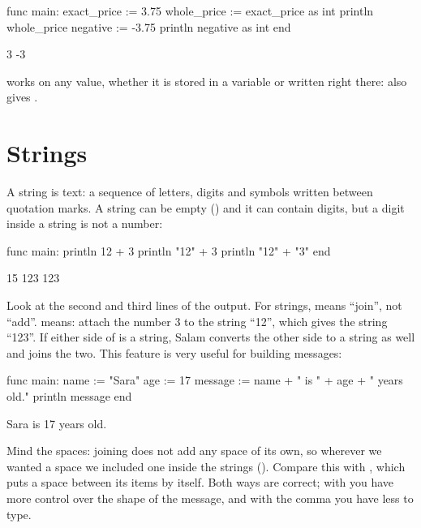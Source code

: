 \begin{salamcode}
func main:
    exact_price := 3.75
    whole_price := exact_price as int
    println whole_price
    negative := -3.75
    println negative as int
end
\end{salamcode}

\begin{salamout}
3
-3
\end{salamout}

\begin{note}
 works on any value, whether it is stored in a variable or written
right there:  also gives .
\end{note}

\section{Strings}

A string is text: a sequence of letters, digits and symbols written between
quotation marks. A string can be empty () and it can contain
digits, but a digit inside a string is not a number:

\begin{salamcode}
func main:
    println 12 + 3
    println "12" + 3
    println "12" + "3"
end
\end{salamcode}

\begin{salamout}
15
123
123
\end{salamout}

Look at the second and third lines of the output. For strings, \code{+}
means ``join'', not ``add''.  means: attach the number 3 to
the string ``12'', which gives the string ``123''. If either side of
\code{+} is a string, Salam converts the other side to a string as well and
joins the two. This feature is very useful for building messages:

\begin{salamcode}
func main:
    name := "Sara"
    age := 17
    message := name + " is " + age + " years old."
    println message
end
\end{salamcode}

\begin{salamout}
Sara is 17 years old.
\end{salamout}

Mind the spaces: joining does not add any space of its own, so wherever we
wanted a space we included one inside the strings (). Compare
this with , which puts a space between its items by
itself. Both ways are correct; with \code{+} you have more control over the
shape of the message, and with the comma you have less to type.

